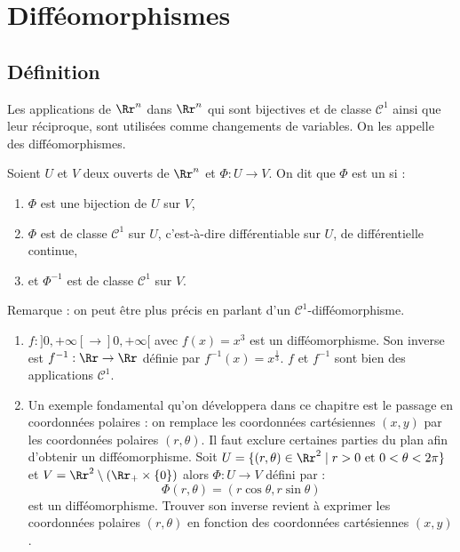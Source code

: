 \documentclass[11pt, class=report,crop=false]{standalone}
\begin{document}


\section{Difféomorphismes}

\subsection{Définition}

Les applications de $\Rr^n$ dans $\Rr^n$ qui sont bijectives et de classe $\mathcal{C}^1$ ainsi que leur réciproque, sont utilisées comme changements de variables. On les appelle des difféomorphismes.

\begin{definition}
Soient $U$ et $V$ deux ouverts de $\Rr^n$ et $\Phi:U\to V$.
On dit que $\Phi$ est un  si :
\begin{enumerate}
    \item $\Phi$ est une bijection de $U$ sur $V$,
    \item $\Phi$ est de classe $\mathcal{C}^1$ sur $U$, c'est-à-dire différentiable sur $U$, de différentielle continue,
    \item et $\Phi^{-1}$ est de classe $\mathcal{C}^1$ sur $V$.
\end{enumerate}
\end{definition}

Remarque : on peut être plus précis en parlant d'un $\mathcal{C}^1$-difféomorphisme.

\begin{exemple}
\sauteligne
\begin{enumerate}
    \item $f : ]0,+\infty[ \to ]0,+\infty[$ avec $f(x) = x^3$ est un difféomorphisme. Son inverse est $f^{-1} : \Rr \to \Rr$ définie par $f^{-1}(x) = x^{\frac13}$. $f$ et $f^{-1}$ sont bien des applications $\mathcal{C}^1$.
    
    \item Un exemple fondamental qu'on développera dans ce chapitre est le passage en coordonnées polaires : on remplace les coordonnées cartésiennes $(x,y)$ par les coordonnées polaires $(r,\theta)$.  Il faut exclure certaines parties du plan afin d'obtenir un difféomorphisme.
    Soit $U = \{ (r,\theta) \in \Rr^2 \mid r>0 \text{ et } 0 < \theta < 2\pi \}$ et $V = \Rr^2 \setminus (\Rr_+ \times \{ 0 \})$ alors
    $\Phi : U \to V$ défini par :
    $$\Phi(r,\theta) = (r\cos\theta, r \sin\theta)$$
    est un difféomorphisme.
    Trouver son inverse revient à exprimer les coordonnées polaires $(r,\theta)$ en fonction des coordonnées cartésiennes $(x,y)$.

    
\end{enumerate}    
\end{exemple}
    
\end{document}
